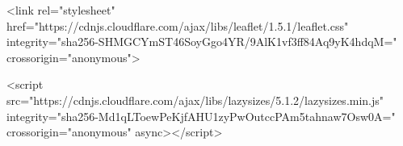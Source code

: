     <link rel="stylesheet" href="https://cdnjs.cloudflare.com/ajax/libs/leaflet/1.5.1/leaflet.css" integrity="sha256-SHMGCYmST46SoyGgo4YR/9AlK1vf3ff84Aq9yK4hdqM=" crossorigin="anonymous">


















































































        <script src="https://cdnjs.cloudflare.com/ajax/libs/lazysizes/5.1.2/lazysizes.min.js" integrity="sha256-Md1qLToewPeKjfAHU1zyPwOutccPAm5tahnaw7Osw0A=" crossorigin="anonymous" async></script>






































